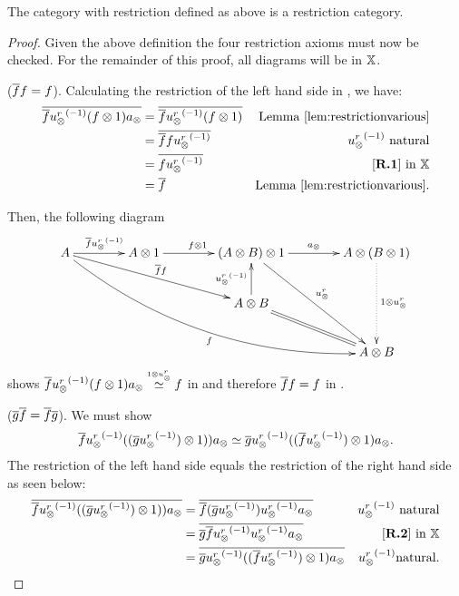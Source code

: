 \begin{lemma}\label{lem:xt_is_a_restriction_category}
  The category \Xt with restriction defined as above is a restriction category.
\end{lemma}
\begin{proof}
  Given the above definition the four restriction axioms must now be checked. For the remainder of
  this proof, all diagrams will be in $\mathbb{X}$.

  \rone ($\overline{f} f = f$). Calculating the restriction of the left hand side in
      \X, we have:
      \begin{align*}
        \restr{\rst{f}\inv{\usr} (f\*1) a_{\*}} & = \restr{\rst{f}\inv{\usr} (f\*1)}
          & \text{Lemma \ref{lem:restrictionvarious}}\\
        & = \restr{\rst{f}f \inv{\usr}}  & \inv{\usr} \text{ natural}\\
        & = \restr{f \inv{\usr}}  & \text{ \rone in }\X\\
        & = \restr{f } & \text{Lemma \ref{lem:restrictionvarious}}.
      \end{align*}

      Then, the following diagram
      \[
        \xymatrix @C=40pt @R=25pt{
          A \ar[r]^{\restr{f} \inv{\usr}}
          \ar @/_25pt/[ddrrr]_f  \ar[drr]^{\restr{f}f}
          &A \* 1 \ar[r]^{f\* 1}
          &(A \* B) \* 1 \ar[r]^{a_{\*}} \ar[ddr]^{\usr}
          &A \* (B \* 1) \ar@{.>}[dd]^{1 \* {\usr}}\\
          &&A\*B \ar[u]^{\inv{\usr}} \ar@{=} [dr]\\
          && &A \* B
        }
      \]
      shows $\overline{f}{u_{\otimes}^r}^{(-1)} (f\otimes1) a_{\otimes} \overset{\scriptscriptstyle 1 \otimes {\ensuremath{u_{\otimes}^r}}}{\simeq} f$ in \X and therefore $\overline{f}f
      = f$ in \Xt.

     \rtwo ($\overline{g} \overline{f} = \overline{f} \overline{g}$). We must show
      \begin{equation}
        \overline{f}{u_{\otimes}^r}^{(-1)} ((\overline{g}{u_{\otimes}^r}^{(-1)})\otimes1)) a_{\otimes} \overset{\scriptscriptstyle }{\simeq}
        \overline{g}{u_{\otimes}^r}^{(-1)}((\overline{f}{u_{\otimes}^r}^{(-1)})\otimes1) a_{\otimes}.
        \label{eq:rtwo_in_xt}
      \end{equation}
      The restriction of the left hand
      side equals the restriction of the right hand side as seen below:
      \begin{align*}
        \restr{\rst{f}\inv{\usr} ((\restr{g}\inv\usr)\*1)) a_{\*}}
        & = \restr{\rst{f}(\restr{g}\inv\usr)\inv{\usr} a_{\*}} & \inv{\usr}   \text{ natural}\\
        & = \restr{\rst{g}\restr{f}\inv\usr\inv{\usr} a_{\*}} &  \text{\rtwo in }\X\\
        & = \restr{\rst{g}\inv{\usr}((\restr{f}\inv\usr)\*1) a_{\*}} & \inv{\usr}   \text{natural}.
      \end{align*}


\end{proof}
